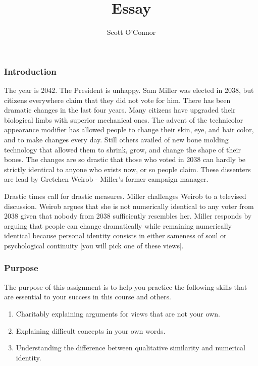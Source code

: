 \documentclass[]{article}
\title{Essay}
\author{Scott O’Connor}
\providecommand{\tightlist}{%
  \setlength{\itemsep}{0pt}\setlength{\parskip}{0pt}}
\begin{document}
\maketitle

\subsubsection{Introduction}\label{introduction}

The year is 2042. The President is unhappy. Sam Miller was elected in
2038, but citizens everywhere claim that they did not vote for him.
There has been dramatic changes in the last four years. Many citizens
have upgraded their biological limbs with superior mechanical ones. The
advent of the technicolor appearance modifier has allowed people to
change their skin, eye, and hair color, and to make changes every day.
Still others availed of new bone molding technology that allowed them to
shrink, grow, and change the shape of their bones. The changes are so
drastic that those who voted in 2038 can hardly be strictly identical to
anyone who exists now, or so people claim. These dissenters are lead by
Gretchen Weirob - Miller's former campaign manager.

Drastic times call for drastic measures. Miller challenges Weirob to a
televised discussion. Weirob argues that she is not numerically
identical to any voter from 2038 given that nobody from 2038
sufficiently resembles her. Miller responds by arguing that people can
change dramatically while remaining numerically identical because
personal identity consists in either sameness of soul or psychological
continuity {[}you will pick one of these views{]}.

\subsubsection{Purpose}\label{purpose}

The purpose of this assignment is to help you practice the following
skills that are essential to your success in this course and others.

\begin{enumerate}
\def\labelenumi{\arabic{enumi}.}
\tightlist
\item
  Charitably explaining arguments for views that are not your own.
\item
  Explaining difficult concepts in your own words.
\item
  Understanding the difference between qualitative similarity and
  numerical identity.
\end{enumerate}
\end{document}

